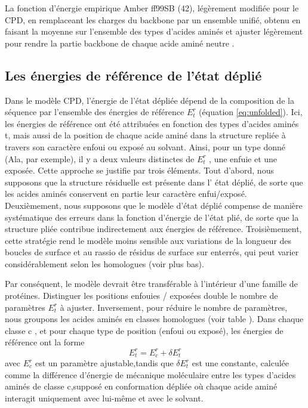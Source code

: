La fonction d'énergie empirique Amber ff99SB (42), légèrement modifiée pour le CPD, en remplaceant les charges du backbone par un ensemble unifié, obtenu en faisant la moyenne sur l'ensemble des types  d'acides aminés et ajuster légèrement pour rendre la partie backbone de chaque acide aminé neutre \cite{Aleksandrov10b}.

\subsection{Les énergies de référence de l'état déplié}

Dans le modèle CPD, l'énergie de l'état dépliée dépend de la composition de la séquence par l'ensemble des énergies de référence $E^r_t$ (équation \ref{eq:unfolded}). Ici, les énergies de référence ont été attribuées en fonction des types d'acides aminés t, mais aussi de la position de chaque acide aminé dans la structure repliée à travers son caractère enfoui ou exposé au solvant. Ainsi, pour un type donné (Ala, par exemple), il y a deux valeurs distinctes de $E^r_t$ , une enfuie et une exposée. Cette approche se justifie par trois éléments. Tout d'abord, nous supposons que la structure résiduelle est présente dans l' état déplié, de sorte que les acides aminés conservent en partie leur caractère enfui/exposé. Deuxièmement, nous supposons que le modèle d'état déplié compense de manière systématique des erreurs dans la fonction d'énergie de l'état plié, de sorte que  la structure pliée contribue indirectement aux énergies de référence. Troisièmement, cette stratégie rend le modèle moins sensible aux variations de la longueur des boucles de surface et au rassio  de résidus de surface sur  enterrés, qui peut varier considérablement selon les homologues (voir plus bas).  

Par conséquent, le modèle devrait être transférable à l'intérieur d'une famille de protéines. Distinguer les positions enfouies / exposées double le nombre de paramètres $E^r_t$ à ajuster. Inversement, pour réduire le nombre de paramètres, nous groupons les acides aminés en classes homologues (voir table ). Dans chaque classe c , et pour chaque type de position (enfoui ou exposé), les énergies de référence ont la forme
\begin{displaymath}
E^r_t = E^r_c + \delta E^r_t
\end{displaymath}
avec $E^r_c$ est un paramètre ajustable,tandis que $\delta E^r_t$ est une constante, calculée comme la différence d'énergie de mécanique moléculaire entre les types d'acides aminés de classe c,supposé en conformation dépliée où chaque acide aminé interagit uniquement avec lui-même et avec le solvant.

